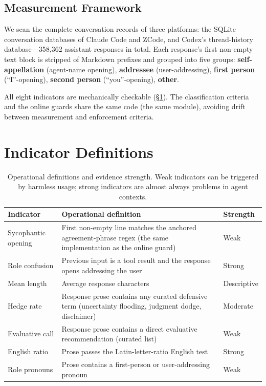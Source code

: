 \documentclass[10pt,twocolumn]{article}
\begin{document}
\subsection{Measurement Framework}
We scan the complete conversation records of three platforms: the SQLite conversation
databases of Claude Code and ZCode, and Codex's thread-history database---358{,}362
assistant responses in total. Each response's first non-empty text block is stripped of
Markdown prefixes and grouped into five groups: \textbf{self-appellation} (agent-name
opening), \textbf{addressee} (user-addressing), \textbf{first person} (``I''-opening),
\textbf{second person} (``you''-opening), \textbf{other}.

All eight indicators are mechanically checkable (\S\ref{sec:metrics}). The classification
criteria and the online guards share the same code (the same module), avoiding drift
between measurement and enforcement criteria.

\section{Indicator Definitions}\label{sec:metrics}
\begin{table}[t]
\centering
\small
\begin{tabular}{p{3.2cm}p{4.6cm}p{1.6cm}}
\toprule
Indicator & Operational definition & Strength \\
\midrule
Sycophantic opening & First non-empty line matches the anchored agreement-phrase
regex (the same implementation as the online guard) & Weak \\
Role confusion & Previous input is a tool result and the response opens addressing the
user & Strong \\
Mean length & Average response characters & Descriptive \\
Hedge rate & Response prose contains any curated defensive term (uncertainty flooding,
judgment dodge, disclaimer) & Moderate \\
Evaluative call & Response prose contains a direct evaluative recommendation (curated
list) & Weak \\
English ratio & Prose passes the Latin-letter-ratio English test & Strong \\
Role pronouns & Prose contains a first-person or user-addressing pronoun & Weak \\
\bottomrule
\end{tabular}
\caption{Operational definitions and evidence strength. Weak indicators can be triggered
by harmless usage; strong indicators are almost always problems in agent contexts.}
\label{tab:metrics}
\end{table}
\end{document}
